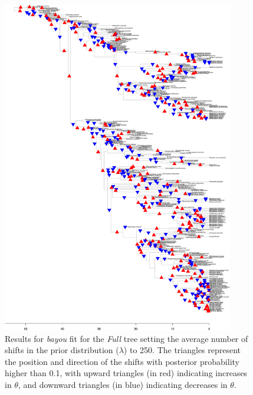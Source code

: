 \begin{figure}[H]
\includegraphics[width=0.9\textwidth]{img/plots-full-wZBL-k250-1.pdf}
\caption{Results for \textit{bayou} fit for the \textit{Full} tree setting the average number of shifts in the prior distribution ($\lambda$) to 250. The triangles represent the position and direction of the shifts with posterior probability higher than 0.1, with upward triangles (in red) indicating increases in $\theta$, and downward triangles (in blue) indicating decreases in $\theta$.}
\label{fig:full-k250}
\end{figure}

\newpage


